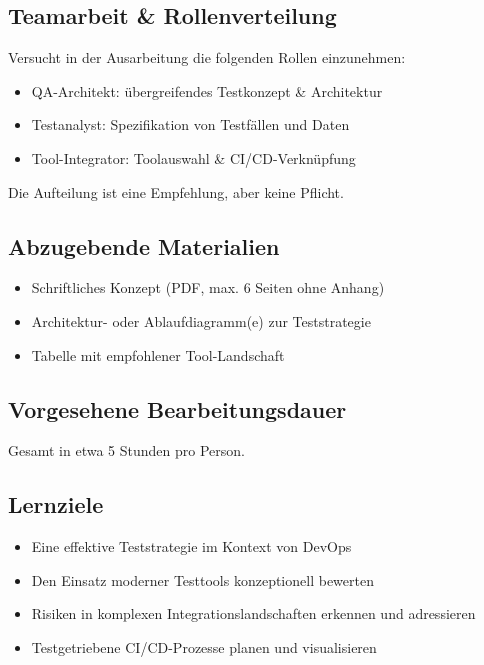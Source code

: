\subsection{Teamarbeit \& Rollenverteilung}
Versucht in der Ausarbeitung die folgenden Rollen einzunehmen:
\begin{itemize}
    \item QA-Architekt: übergreifendes Testkonzept \& Architektur
    \item Testanalyst: Spezifikation von Testfällen und Daten
    \item Tool-Integrator: Toolauswahl \& CI/CD-Verknüpfung
\end{itemize}
Die Aufteilung ist eine Empfehlung, aber keine Pflicht.

\subsection{Abzugebende Materialien}
\begin{itemize}
    \item Schriftliches Konzept (PDF, max. 6 Seiten ohne Anhang)
    \item Architektur- oder Ablaufdiagramm(e) zur Teststrategie
    \item Tabelle mit empfohlener Tool-Landschaft
\end{itemize}

\subsection{Vorgesehene Bearbeitungsdauer}
Gesamt in etwa 5 Stunden pro Person.

\subsection{Lernziele}
\begin{itemize}
    \item Eine effektive Teststrategie im Kontext von DevOps
    \item Den Einsatz moderner Testtools konzeptionell bewerten
    \item Risiken in komplexen Integrationslandschaften erkennen und adressieren
    \item Testgetriebene CI/CD-Prozesse planen und visualisieren
\end{itemize}

